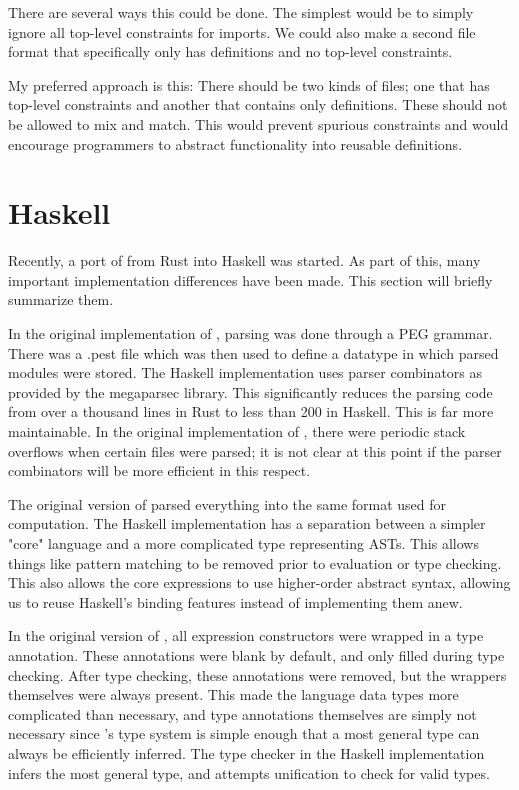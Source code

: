\documentclass[
    9pt,            
    techreport,       
    affiltop,       
]{art}
\begin{document}
There are several ways this could be done. The simplest would be to simply ignore all top-level constraints for imports. We could also make a second file format that specifically only has definitions and no top-level constraints.

My preferred approach is this: There should be two kinds of \VampIR{} files; one that has top-level constraints and another that contains only definitions. These should not be allowed to mix and match. This would prevent spurious constraints and would encourage programmers to abstract functionality into reusable definitions.

\section{\VampIR{} Haskell}\label{sec:vamp-ir-haskell}

Recently, a port of \VampIR{} from Rust into Haskell was started. As part of this, many important implementation differences have been made. This section will briefly summarize them.

In the original implementation of \VampIR{}, parsing was done through a PEG grammar. There was a .pest file which was then used to define a datatype in which parsed modules were stored. The Haskell implementation uses parser combinators as provided by the megaparsec library. This significantly reduces the parsing code from over a thousand lines in Rust to less than 200 in Haskell. This is far more maintainable. In the original implementation of \VampIR{}, there were periodic stack overflows when certain files were parsed; it is not clear at this point if the parser combinators will be more efficient in this respect.

The original version of \VampIR{} parsed everything into the same format used for computation. The Haskell implementation has a separation between a simpler "core" language and a more complicated type representing \VampIR{} ASTs. This allows things like pattern matching to be removed prior to evaluation or type checking. This also allows the core expressions to use higher-order abstract syntax, allowing us to reuse Haskell's binding features instead of implementing them anew.

In the original version of \VampIR{}, all expression constructors were wrapped in a type annotation. These annotations were blank by default, and only filled during type checking. After type checking, these annotations were removed, but the wrappers themselves were always present. This made the language data types more complicated than necessary, and type annotations themselves are simply not necessary since \VampIR{}'s type system is simple enough that a most general type can always be efficiently inferred. The type checker in the Haskell implementation infers the most general type, and attempts unification to check for valid types.
\end{document}
